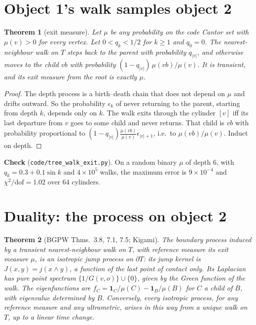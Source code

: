 \documentclass[11pt]{article}
\newtheorem{theorem}{Theorem}[section]
\theoremstyle{definition}
\theoremstyle{remark}
\begin{document}
\section{Object 1's walk samples object 2}

\begin{theorem}[exit measure]\label{thm:exit}
Let $\mu$ be any probability on the code Cantor set with $\mu(v)>0$ for every vertex. Let $0<q_k<1/2$ for $k\ge1$ and $q_0=0$. The nearest-neighbour walk on $T$ steps back to the parent with probability $q_{|v|}$, and otherwise moves to the child $vb$ with probability $(1-q_{|v|})\,\mu(vb)/\mu(v)$. It is transient, and its exit measure from the root is exactly $\mu$.
\end{theorem}

\begin{proof}
The depth process is a birth--death chain that does not depend on $\mu$ and drifts outward. So the probability $\epsilon_{k}$ of never returning to the parent, starting from depth $k$, depends only on $k$. The walk exits through the cylinder $[v]$ iff its last departure from $v$ goes to some child and never returns. That child is $vb$ with probability proportional to $(1-q_{|v|})\frac{\mu(vb)}{\mu(v)}\epsilon_{|v|+1}$, i.e.\ to $\mu(vb)/\mu(v)$. Induct on depth.
\end{proof}

\textbf{Check} (\texttt{code/tree\_walk\_exit.py}). On a random binary $\mu$ of depth $6$, with $q_k=0.3+0.1\sin k$ and $4\times10^5$ walks, the maximum error is $9\times10^{-4}$ and $\chi^2/\mathrm{dof}=1.02$ over $64$ cylinders.

\section{Duality: the process on object 2}

\begin{theorem}[BGPW Thms.~3.8, 7.1, 7.5; Kigami]\label{thm:dual}
The boundary process induced by a transient nearest-neighbour walk on $T$, with reference measure its exit measure $\mu$, is an \emph{isotropic} jump process on $\partial T$: its jump kernel is $J(x,y)=j(x\wedge y)$, a function of the last point of contact only. Its Laplacian has pure point spectrum $\{1/G(v,o)\}\cup\{0\}$, given by the Green function of the walk. The eigenfunctions are $f_C=\mathbf 1_C/\mu(C)-\mathbf 1_B/\mu(B)$ for $C$ a child of $B$, with eigenvalue determined by $B$. Conversely, every isotropic process, for any reference measure and any ultrametric, arises in this way from a unique walk on $T$, up to a linear time change.
\end{theorem}
\end{document}
